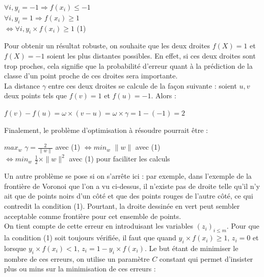 \documentclass{article}
\begin{document}
         \begin{center}
         $\forall i, y_i = -1 \Rightarrow f(x_i) \leq -1$\\
         $\forall i, y_i = 1 \Rightarrow f(x_i) \geq 1$\\
         $\Leftrightarrow \forall i, y_i \times f(x_i) \geq 1$ (1)
         \end{center}

\newpage

Pour obtenir un résultat robuste, on souhaite que les deux droites $f(X) = 1$ et $f(X) = -1$ soient les plus distantes possibles. En effet, si ces deux droites sont trop proches, cela signifie que la probabilité d'erreur quant à la prédiction de la classe d'un point proche de ces droites sera importante.\\

La distance $\gamma$ entre ces deux droites se calcule de la façon suivante : soient $u, v$ deux points tels que $f(v) = 1$ et $f(u) = -1$. Alors :

      \begin{center}
      $f(v) - f(u) = \omega \times (v-u) = \omega \times \gamma = 1 - (-1) = 2$
      \end{center}

Finalement, le problème d'optimisation à résoudre pourrait être :\\
 
           \begin{centre}
           $max_{w}$ $\gamma = \frac{2}{\|w\|}$ avec (1) $\Leftrightarrow min_{w}$ $\|w\|$ avec (1)\\
           $\Leftrightarrow min_{w}$ $\frac{1}{2} \times \|w\|^2$ avec (1) pour faciliter les calculs
           \end{centre}

\bigskip

Un autre problème se pose si on s'arrête ici : par exemple, dans l'exemple de la frontière de Voronoi que l'on a vu ci-dessus, il n'existe pas de droite telle qu'il n'y ait que de points noirs d'un côté et que des points rouges de l'autre côté, ce qui contredit la condition (1). Pourtant, la droite dessinée en vert peut sembler acceptable comme frontière pour cet ensemble de points.\\

On tient compte de cette erreur en introduisant les variables $(z_i)_{i \leq m}$. Pour que la condition (1) soit toujours vérifiée, il faut que quand $y_i \times f(x_i) \geq 1$, $z_i = 0$ et lorsque $y_i \times f(x_i) < 1$, $z_i = 1 - y_i \times f(x_i)$. Le but étant de minimiser le nombre de ces erreurs, on utilise un paramètre $C$ constant qui permet d'insister plus ou mins sur la minimisation de ces erreurs :\\ 
\end{document}
